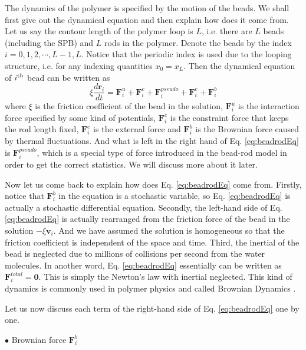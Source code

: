 The dynamics of the polymer is specified by the motion of the beads. We shall first give out the dynamical equation and then explain how does it come from. Let us say the contour length of the polymer loop is $L$, i.e. there are $L$ beads (including the SPB) and $L$ rods in the polymer. Denote the beads by the index $i = 0, 1, 2,\cdots, L-1, L$. Notice that the periodic index is used due to the looping structure, i.e. for any indexing quantities $x_0 = x_L$. Then the dynamical equation of $i^{\rm {th}}$ bead can be written as
\begin{equation}
    \label{eq:beadrodEq}
    \xi \frac{d \mathbf{r}_i}{d t} = \mathbf{F}_i^{u} + \mathbf{F}_i^{c} + \mathbf{F}_i^{pseudo} + \mathbf{F}_i^{e} + \mathbf{F}_i^{b}
\end{equation}
where $\xi$ is the friction coefficient of the bead in the solution, $\mathbf{F}_i^{u}$ is the interaction force specified by some kind of potentials, $\mathbf{F}_i^{c}$ is the constraint force that keeps the rod length fixed, $\mathbf{F}_i^{e}$ is the external force and $\mathbf{F}_i^{b}$ is the Brownian force caused by thermal fluctuations. And what is left in the right hand of Eq. \eqref{eq:beadrodEq} is $\mathbf{F}_i^{pseudo}$, which is a special type of force introduced in the bead-rod model in order to get the correct statistics. We will discuss more about it later. 

Now let us come back to explain how does Eq. \eqref{eq:beadrodEq} come from.  Firstly, notice that $\mathbf{F}_i^b$ in the equation is a stochastic variable, so Eq. \eqref{eq:beadrodEq} is actually a stochastic differential equation. Secondly, the left-hand side of Eq. \eqref{eq:beadrodEq} is actually rearranged from the friction force of the bead in the solution $-\xi\mathbf{v}_i$. And we have assumed the solution is homogeneous so that the friction coefficient is independent of the space and time. Third, the inertial of the bead is neglected due to millions of collisions per second from the water molecules. In another word, Eq. \eqref{eq:beadrodEq} essentially can be written as $\mathbf{F}_i^{total} = \mathbf{0}$. This is simply the Newton's law with inertial neglected. This kind of dynamics is commonly used in polymer physics and called Brownian Dynamics \cite{Somasi2002,Cruz2012}. 

Let us now discuss each term of the right-hand side of Eq. \eqref{eq:beadrodEq} one by one. 

$\bullet$ Brownian force $\mathbf{F}_i^{b}$

